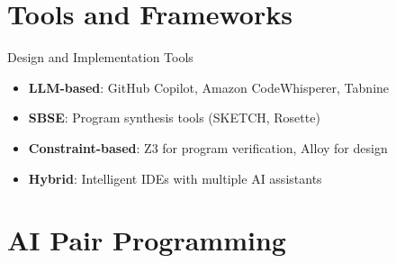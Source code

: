 \documentclass{beamer}
\begin{document}
\section{Tools and Frameworks}
\begin{frame}[t]{Design and Implementation Tools}
\begin{itemize}
\item \textbf{LLM-based}: GitHub Copilot, Amazon CodeWhisperer, Tabnine
\item \textbf{SBSE}: Program synthesis tools (SKETCH, Rosette)
\item \textbf{Constraint-based}: Z3 for program verification, Alloy for design
\item \textbf{Hybrid}: Intelligent IDEs with multiple AI assistants
\end{itemize}
\end{frame}

\section{AI Pair Programming}
\end{document}

